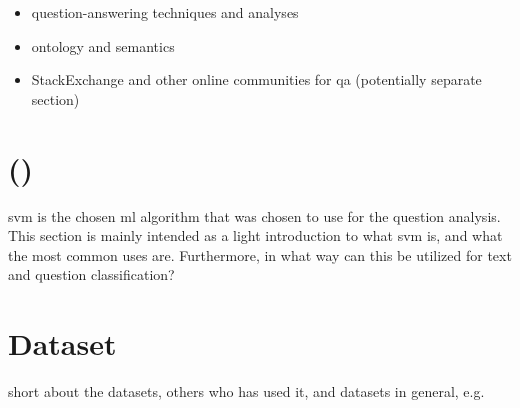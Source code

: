 \begin{itemize}
	\item question-answering techniques and analyses
	\item ontology and semantics
	\item StackExchange and other online communities for qa (potentially separate section)
\end{itemize}

\section{ ()}
\label{sec:svm}
\gls{svm} is the chosen \gls{ml} algorithm that was chosen to use for the question analysis. 
This section is mainly intended as a light introduction to what \gls{svm} is, and what the most common uses are. 
Furthermore, in what way can this be utilized for text and question classification?

\section{Dataset}
\label{sec:dataset}
short about the datasets, others who has used it, and datasets in general, e.g. 
\cite{Klein2016,SpaceMachine.net2016,Wissner-Gross2016}

